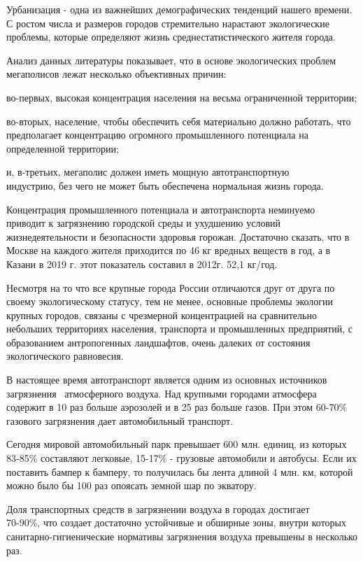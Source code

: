 \documentclass[a4paper, 12pt]{article}
\theoremstyle{definition}
\begin{document}
        Урбанизация - одна из важнейших демографических тенденций нашего времени. С ростом числа и размеров городов стремительно нарастают экологические проблемы, которые определяют жизнь среднестатистического жителя города.  

        Анализ данных литературы показывает, что в основе экологических проблем мегаполисов лежат несколько объективных причин:

        во-первых, высокая концентрация населения на весьма ограниченной территории; 

        во-вторых, население, чтобы обеспечить себя материально должно работать, что предполагает концентрацию огромного промышленного потенциала на\\ определенной территории; 

        и, в-третьих, мегаполис должен иметь мощную автотранспортную\\ индустрию, без чего не может быть обеспечена нормальная жизнь города.

        Концентрация промышленного потенциала и автотранспорта неминуемо\\ приводит к загрязнению городской среды и ухудшению условий жизнедеятельности и безопасности здоровья горожан. Достаточно сказать, что в Москве на каждого жителя приходится по 46 кг вредных веществ в год, а в Казани в 2019 г. этот показатель составил в 2012г. 52,1 кг/год. 
 
        Несмотря на то что все крупные города России отличаются друг от друга по своему экологическому статусу, тем не менее, основные проблемы экологии крупных городов, связаны с чрезмерной концентрацией на сравнительно небольших территориях населения, транспорта и промышленных предприятий, с образованием антропогенных ландшафтов, очень далеких от состояния экологического равновесия.

        В настоящее время автотранспорт является одним из основных источников  загрязнения  атмосферного воздуха. Над крупными городами атмосфера содержит в 10 раз больше аэрозолей и в 25 раз больше газов. При этом 60-70\% газового загрязнения дает автомобильный транспорт.

        Сегодня мировой автомобильный парк превышает 600 млн. единиц, из которых 83-85\% составляют легковые, 15-17\% - грузовые автомобили и автобусы. Если их поставить бампер к бамперу, то получилась бы лента длиной 4 млн. км, которой можно было бы 100 раз опоясать земной шар по экватору.
 
        Доля транспортных средств в загрязнении воздуха в городах достигает\\ 70-90\%, что создает достаточно устойчивые и обширные зоны, внутри которых санитарно-гигиенические нормативы загрязнения воздуха превышены в несколько раз.
\end{document}
